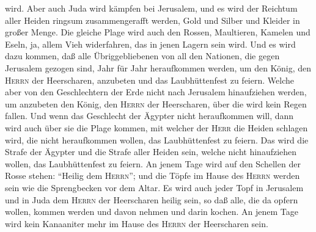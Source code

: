 wird.  Aber auch Juda wird kämpfen bei Jerusalem, und es
wird der Reichtum aller Heiden ringsum zusammengerafft werden, Gold und
Silber und Kleider in großer Menge.  Die gleiche Plage
wird auch den Rossen, Maultieren, Kamelen und Eseln, ja, allem Vieh
widerfahren, das in jenen Lagern sein wird.  Und es wird
dazu kommen, daß alle Übriggebliebenen von all den Nationen, die gegen
Jerusalem gezogen sind, Jahr für Jahr heraufkommen werden, um den König,
den \textsc{Herrn} der Heerscharen, anzubeten und das Laubhüttenfest zu
feiern.  Welche aber von den Geschlechtern der Erde nicht
nach Jerusalem hinaufziehen werden, um anzubeten den König, den
\textsc{Herrn} der Heerscharen, über die wird kein Regen fallen.
 Und wenn das Geschlecht der Ägypter nicht heraufkommen
will, dann wird auch über sie die Plage kommen, mit welcher der
\textsc{Herr} die Heiden schlagen wird, die nicht heraufkommen wollen,
das Laubhüttenfest zu feiern.  Das wird die Strafe der
Ägypter und die Strafe aller Heiden sein, welche nicht hinaufziehen
wollen, das Laubhüttenfest zu feiern.  An jenem Tage wird
auf den Schellen der Rosse stehen: ``Heilig dem \textsc{Herrn}''; und
die Töpfe im Hause des \textsc{Herrn} werden sein wie die Sprengbecken
vor dem Altar.  Es wird auch jeder Topf in Jerusalem und
in Juda dem \textsc{Herrn} der Heerscharen heilig sein, so daß alle, die
da opfern wollen, kommen werden und davon nehmen und darin kochen. An
jenem Tage wird kein Kanaaniter mehr im Hause des \textsc{Herrn} der
Heerscharen sein.
